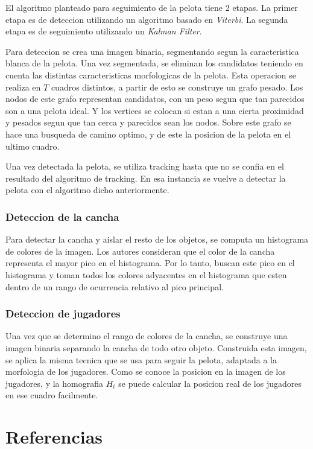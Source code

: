 \documentclass[a4paper,10pt]{article}
\begin{document}
El algoritmo planteado para seguimiento de la pelota tiene 2 etapas.
La primer etapa es de deteccion utilizando un algoritmo basado en \textit{Viterbi}.
La segunda etapa es de seguimiento utilizando un \textit{Kalman Filter}.

Para deteccion se crea una imagen binaria, segmentando segun la caracteristica blanca de la pelota.
Una vez segmentada, se eliminan los candidatos teniendo en cuenta las distintas caracteristicas morfologicas de la pelota. 
Esta operacion se realiza en $T$ cuadros distintos, a partir de esto se construye un grafo pesado.
Los nodos de este grafo representan candidatos, con un peso segun que tan parecidos son a una pelota ideal.
Y los vertices se colocan si estan a una cierta proximidad y pesados segun que tan cerca y parecidos sean los nodos.
Sobre este grafo se hace una busqueda de camino optimo, y de este la posicion de la pelota en el ultimo cuadro.

Una vez detectada la pelota, se utiliza tracking hasta que no se confia en el resultado del algoritmo de tracking.
En esa instancia se vuelve a detectar la pelota con el algoritmo dicho anteriormente.

\subsubsection*{Deteccion de la cancha}

Para detectar la cancha y aislar el resto de los objetos, se computa un histograma de colores de la imagen.
Los autores consideran que el color de la cancha representa el mayor pico en el histograma.
Por lo tanto, buscan este pico en el histograma y toman todos los colores adyacentes en el histograma que esten dentro de un rango de ocurrencia relativo al pico principal.

\subsubsection*{Deteccion de jugadores}

Una vez que se determino el rango de colores de la cancha, se construye una imagen binaria separando la cancha de todo otro objeto.
Construida esta imagen, se aplica la misma tecnica que se usa para seguir la pelota, adaptada a la morfologia de los jugadores.
Como se conoce la posicion en la imagen de los jugadores, y la homografia $H_t$ se puede calcular la posicion real de los jugadores en ese cuadro facilmente.



\section*{Referencias}
\printbibliography
\end{document}
